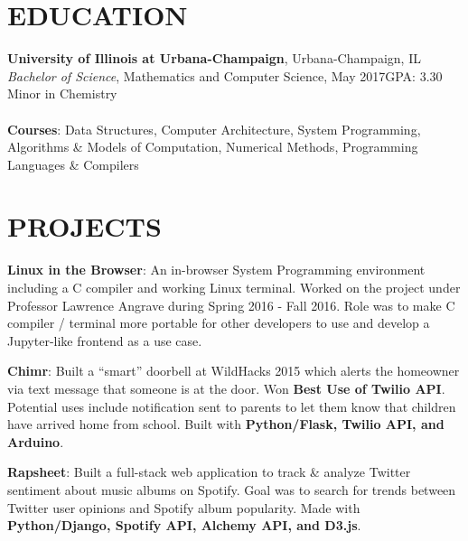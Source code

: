 \documentclass[margin]{res}
\begin{document}
\begin{resume}

\section{EDUCATION}
\textbf{University of Illinois at Urbana-Champaign}, Urbana-Champaign, IL\\
{\sl Bachelor of Science}, Mathematics and Computer Science, May 2017\hfill GPA:
3.30
\\
Minor in Chemistry
\\
\\
\textbf{Courses}: Data Structures, Computer Architecture, System Programming,
Algorithms \& Models of Computation, Numerical Methods, Programming Languages
\& Compilers


\section{PROJECTS}
\par
\textbf{Linux in the Browser}:
An in-browser System Programming environment including a C compiler and working
Linux terminal. Worked on the project under Professor Lawrence Angrave during
Spring 2016 - Fall 2016. Role was to make C compiler / terminal more portable
for other developers to use and develop a Jupyter-like frontend as a use case.

\par
\textbf{Chimr}:
Built a ``smart'' doorbell at WildHacks 2015 which alerts the homeowner via text
message that someone is at the door. Won \textbf{Best Use of Twilio API}. Potential
uses include notification sent to parents to let them know that children have arrived
home from school. Built with \textbf{Python/Flask, Twilio API, and Arduino}.

\par
\textbf{Rapsheet}:
Built a full-stack web application to track \& analyze Twitter sentiment about music
albums on Spotify. Goal was to search for trends between Twitter user opinions and
Spotify album popularity. Made with \textbf{Python/Django, Spotify API, Alchemy API, and D3.js}.


\end{resume}
\end{document}

